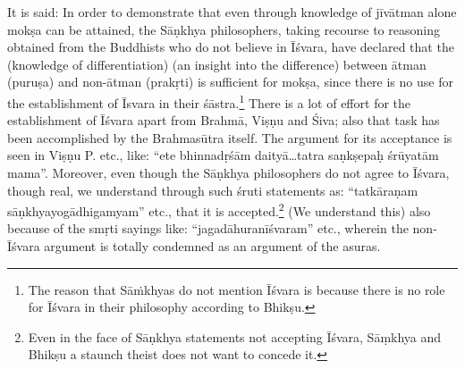 It is said: In order to demonstrate that even through knowledge of jīvātman alone mokṣa can be attained, the Sāṇkhya philosophers, taking recourse to reasoning obtained from the Buddhists who do not believe in Īśvara, have declared that the (knowledge of differentiation) (an insight into the difference) between ātman (puruṣa) and non-ātman (prakṛti) is sufficient  for mokṣa, since there is no use for the establishment of Īsvara in their śāstra.\footnote{The reason that Sāṁkhyas do not mention Īśvara is because there is no role for Īśvara in their philosophy according to Bhikṣu.} There is a lot of effort for the establishment of Īśvara apart from Brahmā, Viṣṇu and Śiva; also that task has been accomplished by the Brahmasūtra itself. The argument for its acceptance is seen in Viṣṇu P. etc., like: “ete bhinnadṛśām daityā…tatra saṇkṣepaḥ śrūyatām mama”. Moreover, even though the Sāṇkhya philosophers do not agree to Īśvara, though real, we understand through such śruti statements as:  “tatkāraṇam sāṇkhyayogādhigamyam” etc., that it is accepted.\footnote{Even in the face of Sāṇkhya statements not accepting Īśvara, Sāṃkhya and Bhikṣu a staunch theist does not want to concede it.} (We understand this) also because of the smṛti sayings like: “jagadāhuranīśvaram” etc., wherein the non-Īśvara argument is totally condemned as an argument of the asuras.



